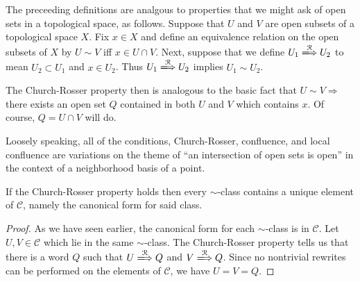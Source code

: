 \begin{rem} The preceeding definitions are analgous to properties that we might
    ask of open sets in a topological space, as follows. Suppose that $U$ and
    $V$ are open subsets of a topological space $X$. Fix $x\in X$ and define an
    equivalence relation on the open subsets of $X$ by $U \sim V$ iff $x\in
    U\cap V$. Next, suppose that we define $U_1 \xLongrightarrow{\mathcal{R}}
    U_2$ to mean $U_2 \subset U_1$ and $x\in U_2$. Thus $U_1
    \xLongrightarrow{\mathcal{R}} U_2$ implies $U_1 \sim U_2$.

    The Church-Rosser property then is analogous to the basic fact that $U\sim
    V \Rightarrow $ there exists an open set $Q$ contained in both $U$ and $V$
    which contains $x$. Of course, $Q = U\cap V$ will do.


    Loosely speaking, all of the conditions, Church-Rosser, confluence, and
    local confluence are variations on the theme of  ``an intersection of open
    sets is open'' in the context of a neighborhood basis of a point.
\end{rem}

\begin{prop}\label{CR1} If the Church-Rosser property holds then every
    $\sim$-class contains a unique element of $\mathcal{C}$, namely the
    canonical form for said class.
\end{prop}
\begin{proof} As we have seen earlier, the canonical form for each $\sim$-class
    is in $\mathcal{C}$. Let $U,V\in \mathcal{C}$ which lie in the same
    $\sim$-class. The Church-Rosser property tells us that there is a word $Q$
    such that $U\xLongrightarrow{\mathcal{R}} Q$ and $V
    \xLongrightarrow{\mathcal{R}} Q$. Since no nontrivial rewrites can be
    performed on the elements of $\mathcal{C}$, we have $U = V = Q.$
\end{proof}

